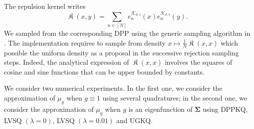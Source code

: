 \documentclass[twoside,11pt]{book}
\numberwithin{theorem}{chapter}
\numberwithin{definition}{chapter}
\numberwithin{proposition}{chapter}
\numberwithin{corollary}{chapter}
\numberwithin{example}{chapter}
\numberwithin{lemma}{chapter}
\numberwithin{assumption}{chapter}
\numberwithin{equation}{chapter}
\numberwithin{figure}{chapter}
\DeclareMathOperator*{\KDPP}{\mathfrak{K}}
\begin{document}
The repulsion kernel writes
\begin{equation}
\KDPP(x,y) =\sum\limits_{n \in [N]} e_{n}^{\mathcal{K}_{d,s}}(x)e_{n}^{\mathcal{K}_{d,s}}(y).
\end{equation}
We sampled from the corresponding DPP using the generic sampling algorithm in \cite{HoKrPeVi06}. The implementation requires to sample from density $x \mapsto \frac{1}{N} \KDPP(x,x)$ which possible the uniform density as a proposal in the successive rejection sampling steps. Indeed, the analytical expression of $\KDPP(x,x)$ involves the squares of cosine and sine functions that can be upper bounded by constants.


We consider two numerical experiments. In the first one, we consider the approximation of $\mu_{g}$ when $g \equiv 1$ using several quadratures; in the second one, we consider the approximation of $\mu_{g}$ when $g$ is an eigenfunction of $\bm{\Sigma}$ using DPPKQ, LVSQ $(\lambda = 0)$, LVSQ $(\lambda = 0.01)$ and UGKQ. 

\end{document}
